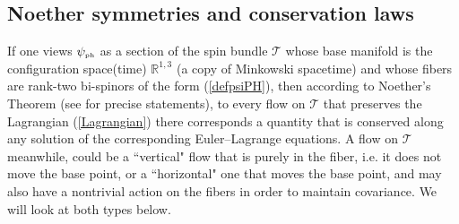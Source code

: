 \documentclass[12pt]{article}
\theoremstyle{definition}
\newcommand{\refeq}[1]{(\ref{#1})}
\numberwithin{equation}{section}
\newcommand{\cT}{\mathcal{T}}
\newcommand{\psiPH}{{\psi_{\mbox{\rm\tiny ph}}}}
\newcommand{\Rset}{{\mathbb R}}
\begin{document}
\subsection{Noether symmetries and conservation laws}
 If one views $\psiPH$ as a section of the spin bundle $\cT$ whose base manifold is the configuration space(time) $\Rset^{1,3}$ (a copy 
of Minkowski spacetime) and whose fibers are rank-two bi-spinors of the form \refeq{defpsiPH}, then according to Noether\rq{}s 
Theorem \cite{Noe1918}  (see \cite{Chr2000} for precise statements), to every flow on $\cT$ that preserves the Lagrangian \refeq{Lagrangian} 
there corresponds a quantity that is conserved along any solution of the corresponding Euler--Lagrange equations. 
 A flow on $\cT$ meanwhile, could be a ``vertical" flow that is purely in the fiber, i.e. it does not move the base point, or a ``horizontal" one 
that moves the base point, and may also  have a nontrivial action on the fibers in order to maintain covariance. 
  We will look at both types below.

\end{document}
